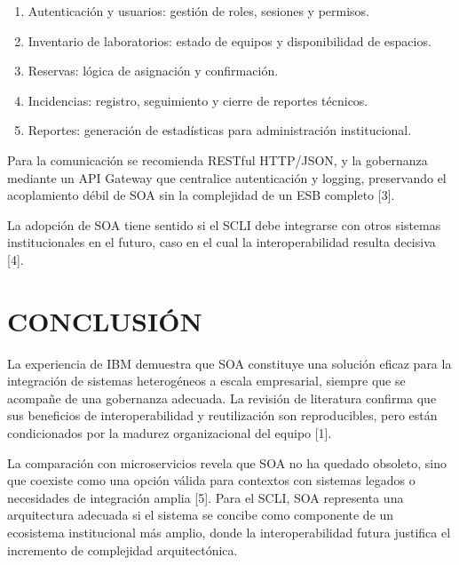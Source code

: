 \documentclass[conference]{IEEEtran}
\begin{document}
\begin{enumerate}
\item Autenticación y usuarios: gestión de roles, sesiones y permisos.
\item Inventario de laboratorios: estado de equipos y disponibilidad de espacios.
\item Reservas: lógica de asignación y confirmación.
\item Incidencias: registro, seguimiento y cierre de reportes técnicos.
\item Reportes: generación de estadísticas para administración institucional.
\end{enumerate}

Para la comunicación se recomienda RESTful HTTP/JSON, y la gobernanza mediante un API Gateway que centralice autenticación y logging, preservando el acoplamiento débil de SOA sin la complejidad de un ESB completo [3].

La adopción de SOA tiene sentido si el SCLI debe integrarse con otros sistemas institucionales en el futuro, caso en el cual la interoperabilidad resulta decisiva [4].

\section{CONCLUSIÓN}

La experiencia de IBM demuestra que SOA constituye una solución eficaz para la integración de sistemas heterogéneos a escala empresarial, siempre que se acompañe de una gobernanza adecuada. La revisión de literatura confirma que sus beneficios de interoperabilidad y reutilización son reproducibles, pero están condicionados por la madurez organizacional del equipo [1].

La comparación con microservicios revela que SOA no ha quedado obsoleto, sino que coexiste como una opción válida para contextos con sistemas legados o necesidades de integración amplia [5]. Para el SCLI, SOA representa una arquitectura adecuada si el sistema se concibe como componente de un ecosistema institucional más amplio, donde la interoperabilidad futura justifica el incremento de complejidad arquitectónica.
\end{document}
